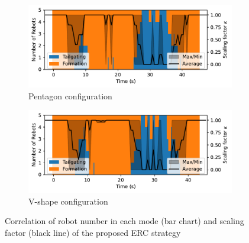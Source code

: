 \begin{figure}[!h]
\begin{subfigure}[b]{0.49\textwidth}
    
    \centering
    \includegraphics[width=\linewidth]{paper2/images/mode_edc_shape1.pdf}
    \caption{Pentagon configuration}
    \label{fig:1mode_edc1}
\end{subfigure}
\begin{subfigure}[b]{0.49\textwidth}
    \centering
    \includegraphics[width=\linewidth]{paper2/images/mode_edc_shape2.pdf}
    \caption{V-shape configuration}
    \label{fig:1mode_edc2}
\end{subfigure}
\caption{Correlation of robot number in each mode (bar chart) and scaling factor (black line) of the proposed ERC strategy}
\label{fig:1mode}
\end{figure}

